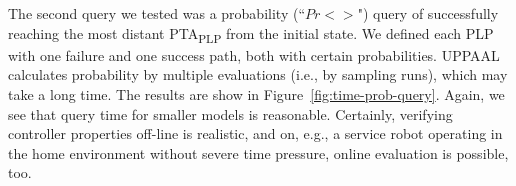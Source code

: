 \documentclass[letterpaper]{article}
\newcommand{\frameImage}[4]{
\begin{figure}[H]
  \centerline{
    \fcolorbox{frameColor}{white}{
        \texttt{[image: \#1]} } }
    \caption{#4}
    \label{fig:#1}
\end{figure}
}
\begin{document}
The second query we tested was a probability (``$Pr<>$") query of successfully reaching the most distant PTA\textsubscript{PLP} from the initial state. We defined each PLP with one failure and one success path, both with certain probabilities. UPPAAL calculates probability by multiple evaluations (i.e., by sampling runs), which may take a long time.
%
%
%
%
%
The results are show in Figure~\ref{fig:time-prob-query}. %
Again, we see that query time for smaller models is reasonable. Certainly, verifying controller properties off-line is realistic, and on, e.g., a service robot operating in the home environment without severe time pressure, online evaluation is possible, too.



\end{document}
